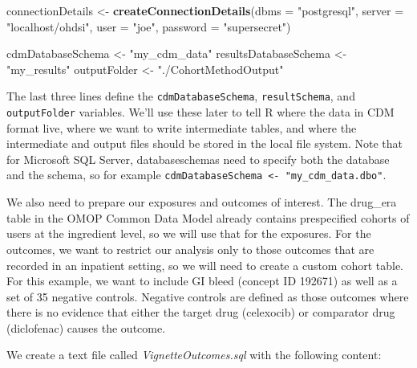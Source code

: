 \documentclass[
]{article}
\newenvironment{Shaded}{\begin{snugshade}}{\end{snugshade}}
\newcommand{\DataTypeTok}[1]{\textcolor[rgb]{0.13,0.29,0.53}{#1}}
\newcommand{\KeywordTok}[1]{\textcolor[rgb]{0.13,0.29,0.53}{\textbf{#1}}}
\newcommand{\NormalTok}[1]{#1}
\newcommand{\StringTok}[1]{\textcolor[rgb]{0.31,0.60,0.02}{#1}}
\begin{document}
\begin{Shaded}
\begin{Highlighting}[]
\NormalTok{connectionDetails <-}\StringTok{ }\KeywordTok{createConnectionDetails}\NormalTok{(}\DataTypeTok{dbms =} \StringTok{"postgresql"}\NormalTok{, }
                                             \DataTypeTok{server =} \StringTok{"localhost/ohdsi"}\NormalTok{, }
                                             \DataTypeTok{user =} \StringTok{"joe"}\NormalTok{, }
                                             \DataTypeTok{password =} \StringTok{"supersecret"}\NormalTok{)}

\NormalTok{cdmDatabaseSchema <-}\StringTok{ "my_cdm_data"}
\NormalTok{resultsDatabaseSchema <-}\StringTok{ "my_results"}
\NormalTok{outputFolder <-}\StringTok{ "./CohortMethodOutput"}
\end{Highlighting}
\end{Shaded}

The last three lines define the \texttt{cdmDatabaseSchema},
\texttt{resultSchema}, and \texttt{outputFolder} variables. We'll use
these later to tell R where the data in CDM format live, where we want
to write intermediate tables, and where the intermediate and output
files should be stored in the local file system. Note that for Microsoft
SQL Server, databaseschemas need to specify both the database and the
schema, so for example
\texttt{cdmDatabaseSchema\ \textless{}-\ "my\_cdm\_data.dbo"}.

We also need to prepare our exposures and outcomes of interest. The
drug\_era table in the OMOP Common Data Model already contains
prespecified cohorts of users at the ingredient level, so we will use
that for the exposures. For the outcomes, we want to restrict our
analysis only to those outcomes that are recorded in an inpatient
setting, so we will need to create a custom cohort table. For this
example, we want to include GI bleed (concept ID 192671) as well as a
set of 35 negative controls. Negative controls are defined as those
outcomes where there is no evidence that either the target drug
(celexocib) or comparator drug (diclofenac) causes the outcome.

We create a text file called \emph{VignetteOutcomes.sql} with the
following content:
\end{document}
